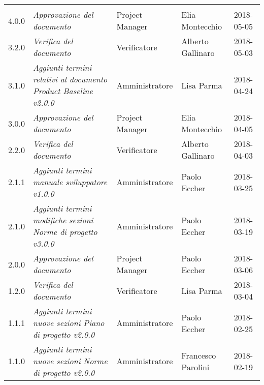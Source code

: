 \newpage 
\section*{}
\begin{longtable}{C{2cm}|C{4cm}|C{3cm}|C{3cm}|R{2cm}}
		
		  &  & &  & \\
		
		
		4.0.0 & \emph{Approvazione del documento} & Project Manager & Elia Montecchio & 2018-05-05  \\
		\hline
		
		3.2.0 & \emph{Verifica del documento} & Verificatore & Alberto Gallinaro & 2018-05-03  \\
		\hline
		
		3.1.0 & \emph{Aggiunti termini relativi al documento Product Baseline v2.0.0 } & Amministratore & Lisa Parma & 2018-04-24  \\
		\hline
		
		3.0.0 & \emph{Approvazione del documento} & Project Manager & Elia Montecchio & 2018-04-05  \\
		\hline
		
		2.2.0 & \emph{Verifica del documento} & Verificatore & Alberto Gallinaro & 2018-04-03  \\
		\hline
		
		2.1.1 & \emph{Aggiunti termini manuale sviluppatore v1.0.0} & Amministratore & Paolo Eccher & 2018-03-25  \\
		\hline
		
		2.1.0 & \emph{Aggiunti termini modifiche sezioni Norme di progetto v3.0.0} & Amministratore &  Paolo Eccher & 2018-03-19  \\
		\hline
		
		2.0.0 & \emph{Approvazione del documento} & Project Manager & Paolo Eccher & 2018-03-06  \\
		\hline
		
		1.2.0 & \emph{Verifica del documento} & Verificatore & Lisa Parma & 2018-03-04  \\
		\hline
		
		1.1.1 & \emph{Aggiunti termini nuove sezioni Piano di progetto v2.0.0} & Amministratore & Paolo Eccher & 2018-02-25  \\
		\hline
		
		1.1.0 & \emph{Aggiunti termini nuove sezioni Norme di progetto v2.0.0} & Amministratore & Francesco Parolini & 2018-02-19  \\
		\hline
		

\end{longtable}
